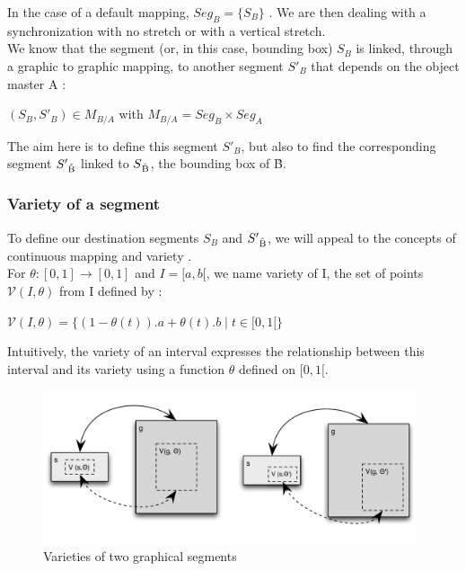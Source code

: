 \documentclass[a4paper]{article}
\newcommand{\variete}			{\ensuremath{\mathcal{V}}}
\begin{document}
In the case of a default mapping, $Seg_B = \{S_B\}$ . We are then dealing with a synchronization with no stretch or with a vertical stretch. 
\\

We know that the segment (or, in this case, bounding box) $S_B$ is linked, through a graphic to graphic mapping, to another segment $S'_B$ that depends on the object master A : 

\begin{center} $(S_B, S'_B) \in M_{B/A}$ with $M_{B/A} = Seg_B \times Seg_A$ \end{center}

The aim here is to define this segment $S'_B$, but also to find the corresponding segment $S'\textsubscript{\r{B}}$ linked to $S\textsubscript{\r{B}}$, the bounding box of \r{B}.

\subsubsection{Variety of a segment}\label{subsubsec:variety}

To define our destination segments $S_B$ and $S'\textsubscript{\r{B}}$, we will appeal to the concepts of continuous mapping and variety .%
\\

For $\theta : [0,1] \rightarrow [0,1]$ and $I = [a,b[$, we name variety of I, the set of points $\variete(I,\theta)$ from I defined by :
\begin{center}
$\variete(I, \theta) =  \lbrace (1 - \theta(t)).a + \theta(t).b \mid t \in [0, 1[ \rbrace$ 
\end{center}

Intuitively, the variety of an interval expresses the relationship between this interval and its variety using a function $\theta$ defined on $[0, 1[$.
\\
\begin{figure}[h]
\centering
\includegraphics[width=11cm]{img/vmapping.pdf}
\caption{Varieties of two graphical segments}
\label{fig:variety}
\end{figure}
\end{document}
